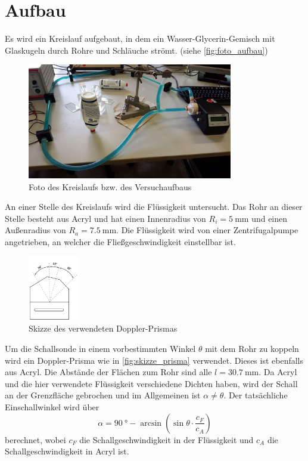 \section{Aufbau}
\label{sec:Aufbau}

Es wird ein Kreislauf aufgebaut, in dem ein Wasser-Glycerin-Gemisch mit Glaskugeln durch Rohre und Schläuche strömt. (siehe \autoref{fig:foto_aufbau})

\begin{figure}
    \centering
    \includegraphics[width=0.8\textwidth]{images/foto_1.jpg}
    \caption{Foto des Kreislaufs bzw. des Versuchaufbaus}
    \label{fig:foto_aufbau}
\end{figure}

An einer Stelle des Kreislaufs wird die Flüssigkeit untersucht.
Das Rohr an dieser Stelle besteht aus Acryl und hat einen Innenradius von $R_i=\SI{5}{\milli\metre}$ und einen Außenradius von $R_a=\SI{7.5}{\milli\metre}$.
Die Flüssigkeit wird von einer Zentrifugalpumpe angetrieben, an welcher die Fließgeschwindigkeit einstellbar ist.

\FloatBarrier

\begin{figure}
    \centering
    \includegraphics[width=0.2\textwidth]{images/skizze_2.png}
    \caption{Skizze des verwendeten Doppler-Prismas \cite{US3}}
    \label{fig:skizze_prisma}
\end{figure}

Um die Schallsonde in einem vorbestimmten Winkel $\theta$ mit dem Rohr zu koppeln wird ein Doppler-Prisma wie in \autoref{fig:skizze_prisma} verwendet.
Dieses ist ebenfalls aus Acryl.
Die Abstände der Flächen zum Rohr sind alle $l=\SI{30.7}{\milli\metre}$.
Da Acryl und die hier verwendete Flüssigkeit verschiedene Dichten haben, wird der Schall an der Grenzfläche gebrochen und im Allgemeinen ist $\alpha \neq \theta$.
Der tatsächliche Einschallwinkel wird über
\begin{equation}
    \alpha = \SI{90}{\degree} - \arcsin \left( \sin \theta \cdot \frac{c_F}{c_A} \right)
    \label{eq:dopplerwinkel}
\end{equation}
berechnet, wobei $c_F$ die Schallgeschwindigkeit in der Flüssigkeit und $c_A$ die Schallgeschwindigkeit in Acryl ist.


